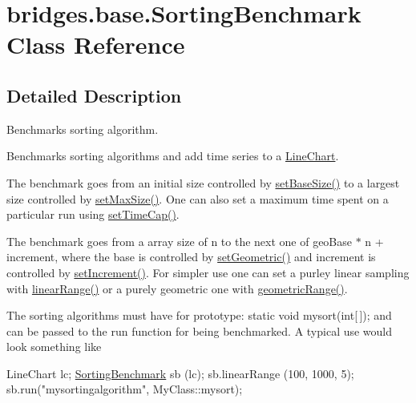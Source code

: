 \hypertarget{classbridges_1_1base_1_1_sorting_benchmark}{}\section{bridges.\+base.\+Sorting\+Benchmark Class Reference}
\label{classbridges_1_1base_1_1_sorting_benchmark}


\subsection{Detailed Description}
Benchmarks sorting algorithm. 

Benchmarks sorting algorithms and add time series to a \hyperlink{classbridges_1_1base_1_1_line_chart}{Line\+Chart}.

The benchmark goes from an initial size controlled by \hyperlink{classbridges_1_1base_1_1_sorting_benchmark_a00a718fd919a43355cd343c6bd9d67c4}{set\+Base\+Size()} to a largest size controlled by \hyperlink{classbridges_1_1base_1_1_sorting_benchmark_a7a390c4820afb92d74ef8f023a6cc227}{set\+Max\+Size()}. One can also set a maximum time spent on a particular run using \hyperlink{classbridges_1_1base_1_1_sorting_benchmark_a52b13910224cfafea16f7f3979a77592}{set\+Time\+Cap()}.

The benchmark goes from a array size of n to the next one of geo\+Base $\ast$ n + increment, where the base is controlled by \hyperlink{classbridges_1_1base_1_1_sorting_benchmark_ac85461710590f4baeea7d7b72da3d66f}{set\+Geometric()} and increment is controlled by \hyperlink{classbridges_1_1base_1_1_sorting_benchmark_aed0a9db639ec08c6ae1b5b70a1662809}{set\+Increment()}. For simpler use one can set a purley linear sampling with \hyperlink{classbridges_1_1base_1_1_sorting_benchmark_a2f412cbff4619ce2984a5c57ec5104e6}{linear\+Range()} or a purely geometric one with \hyperlink{classbridges_1_1base_1_1_sorting_benchmark_afd0eb0b328cf0ee12861004445995530}{geometric\+Range()}.

The sorting algorithms must have for prototype\+: static void mysort(int\mbox{[}$\,$\mbox{]}); and can be passed to the run function for being benchmarked. A typical use would look something like


\begin{DoxyCode}
LineChart lc;
\hyperlink{classbridges_1_1base_1_1_sorting_benchmark_a64bb13d60e83c516b40a9e05a3a651c5}{SortingBenchmark} sb (lc);
sb.linearRange (100, 1000, 5);
sb.run(\textcolor{stringliteral}{"mysortingalgorithm"}, MyClass::mysort);
\end{DoxyCode}


